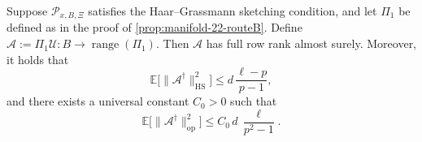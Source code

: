 \documentclass[final,onefignum,onetabnum]{siamart250211}
\begin{document}
\begin{lemma}
  \label{lem:haar-grassmann-A-moments}
  Suppose $\mathcal{P}_{x, B, \Xi}$ satisfies the Haar--Grassmann sketching condition, and let $\Pi_1$ be defined as in the proof of \cref{prop:manifold-22-routeB}.
  Define
  $
  \mathcal A:=\Pi_1\mathcal U:B\to \operatorname{range}(\Pi_1).
  $
  Then $\mathcal A$ has full row rank almost surely. Moreover, it holds that
  \begin{equation}
    \label{eq:A-hs-moment-new}
    \mathbb E\big[\|\mathcal A^{\dagger}\|_{\mathrm{HS}}^{2}\big]
    \le
    d\,\frac{\ell-p}{p-1},
  \end{equation}
  and there exists a universal constant $C_0>0$ such that
  \begin{equation}
    \label{eq:A-op-moment-new}
    \mathbb E\big[\|\mathcal A^{\dagger}\|_{\mathrm{op}}^{2}\big]
    \le
    C_0\,d\,\frac{\ell}{p^{2}-1}.
  \end{equation}
\end{lemma}
\end{document}
